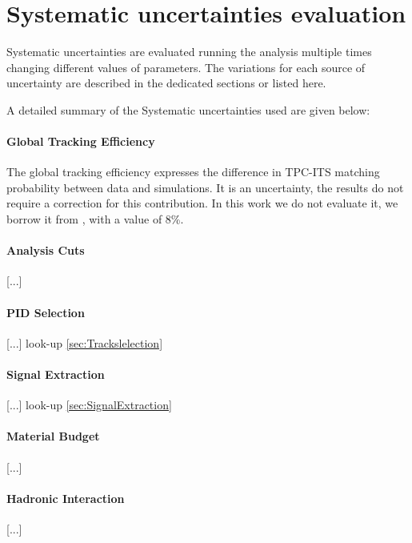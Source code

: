 \section{Systematic uncertainties evaluation}
\label{sec:Systematics}

Systematic uncertainties are evaluated running the analysis multiple times changing different values of parameters. The variations for each source of uncertainty are described in the dedicated sections or listed here. 


A detailed summary of the Systematic uncertainties used are given below:

\paragraph{Global Tracking Efficiency}
The global tracking efficiency expresses the difference in TPC-ITS matching probability between data and simulations. It is an uncertainty, the results do not require a correction for this contribution. In this work we do not evaluate it, we borrow it from \cite{PrevPubMult}, with a value of 8\%.

\paragraph{Analysis Cuts}
[...]

\paragraph{PID Selection}
[...] look-up \ref{sec:Trackslelection}

\paragraph{Signal Extraction}
[...] look-up \ref{sec:SignalExtraction}

\paragraph{Material Budget}
[...]

\paragraph{Hadronic Interaction}
[...]




